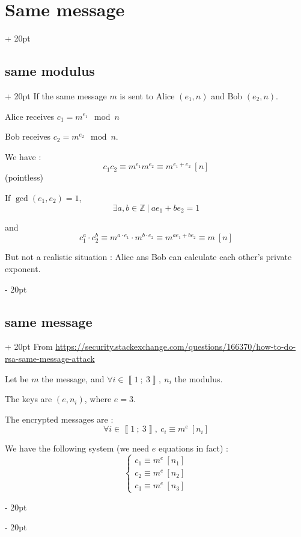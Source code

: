 \documentclass[a4paper, 12pt, twoside]{article}
\newcommand{\Z}{\mathbb{Z}} %
\newcommand{\nset}[2]{\left\llbracket #1\ ;\ #2 \right\rrbracket}
\newcommand{\ind}[1][20pt]{\advance\leftskip + #1}
\newcommand{\deind}[1][20pt]{\advance\leftskip - #1}
\newenvironment{indt}[2][20pt]{#2 \par \ind[#1]}{\par \deind} %
\begin{document}
    \begin{indt}{\section{Same message}}
        \begin{indt}{\subsection{same modulus}}
            If the same message $m$ is sent to Alice $(e_1, n)$ and Bob $(e_2, n)$.

            Alice receives $c_1 = m^{e_1} \mod n$

            Bob receives $c_2 = m^{e_2} \mod n$.

            We have :
            \[
                c_1 c_2 \equiv m^{e_1} m^{e_2} \equiv m^{e_1 + e_2}\ [n]
            \]
            (pointless)

            If $\gcd(e_1, e_2) = 1$,
            \[
                \exists a, b \in \Z\ |\ ae_1 + be_2 = 1
            \]

            and
            \[
                c_1^a \cdot c_2^b
                \equiv m^{a \cdot e_1} \cdot m^{b \cdot e_2}
                \equiv m^{a e_1 + be_2}
                \equiv m\ [n]
            \]

            But not a realistic situation : Alice ans Bob can calculate each other's private exponent.
        \end{indt}

        \vspace{12pt}
        
        \begin{indt}{\subsection{same message}}
            From \url{https://security.stackexchange.com/questions/166370/how-to-do-rsa-same-message-attack}

            Let be $m$ the message, and $\forall i \in \nset 1 3,\ n_i$ the modulus.

            The keys are $(e, n_i)$, where $e = 3$.

            The encrypted messages are :
            \[
                \forall i \in \nset 1 3,\ c_i \equiv m^e\ [n_i]
            \]

            We have the following system (we need $e$ equations in fact) :
            \[
                \begin{cases}
                    c_1 \equiv m^e\ [n_1]
                    \\
                    c_2 \equiv m^e\ [n_2]
                    \\
                    c_3 \equiv m^e\ [n_3]
                \end{cases}
            \]


\end{indt}
\end{indt}
\end{document}

